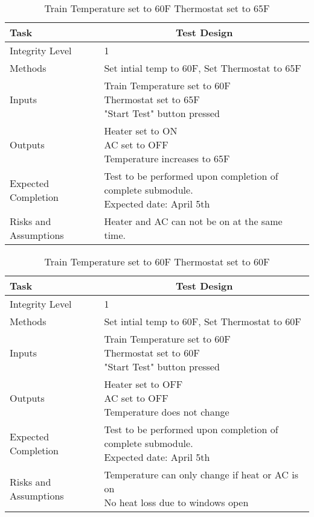 \documentclass[]{article}
\begin{document}
	\begin{table}[H]
		\centering
		\caption{Train Temperature set to 60F Thermostat set to 65F}
		\begin{tabular}{|l|l|}
			\hline
			Task & \multicolumn{1}{c|}{Test Design} \\ \hline
			Integrity Level & 1 \\ \hline
			Methods & Set intial temp to 60F, Set Thermostat to 65F  \\ \hline
			Inputs &  \parbox[t]{10cm}{Train Temperature set to 60F\\ Thermostat set to 65F\\ "Start Test" button pressed }\\ \hline
			Outputs &\parbox[t]{10cm}{ Heater set to ON\\AC set to OFF\\ Temperature increases to 65F} \\ \hline
			Expected Completion & \parbox[t]{10cm}{Test to be performed upon completion of complete submodule.\\ Expected date: April 5th}\\ \hline
			Risks and Assumptions & Heater and AC can not be on at the same time.\\ \hline
		\end{tabular}
	\end{table}



	\begin{table}[H]
		\centering
		\caption{Train Temperature set to 60F Thermostat set to 60F}
		\begin{tabular}{|l|l|}
			\hline
			Task & \multicolumn{1}{c|}{Test Design} \\ \hline
			Integrity Level & 1 \\ \hline
			Methods & Set intial temp to 60F, Set Thermostat to 60F  \\ \hline
			Inputs &  \parbox[t]{10cm}{Train Temperature set to 60F\\ Thermostat set to 60F\\ "Start Test" button pressed }\\ \hline
			Outputs &\parbox[t]{10cm}{ Heater set to OFF\\AC set to OFF\\ Temperature does not change} \\ \hline
			Expected Completion & \parbox[t]{10cm}{Test to be performed upon completion of complete submodule.\\ Expected date: April 5th}\\ \hline
			Risks and Assumptions & \parbox[t]{10cm}{Temperature can only change if heat or AC is on\\ No heat loss due to windows open}\\ \hline
		\end{tabular}
	\end{table}
\end{document}
